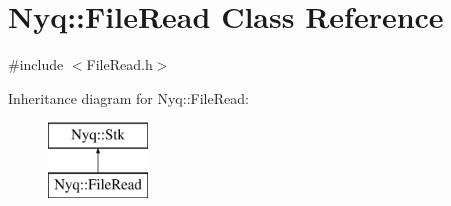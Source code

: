 \hypertarget{class_nyq_1_1_file_read}{}\section{Nyq\+:\+:File\+Read Class Reference}
\label{class_nyq_1_1_file_read}


{\ttfamily \#include $<$File\+Read.\+h$>$}

Inheritance diagram for Nyq\+:\+:File\+Read\+:\begin{figure}[H]
\begin{center}
\leavevmode
\includegraphics[height=2.000000cm]{class_nyq_1_1_file_read}
\end{center}
\end{figure}
